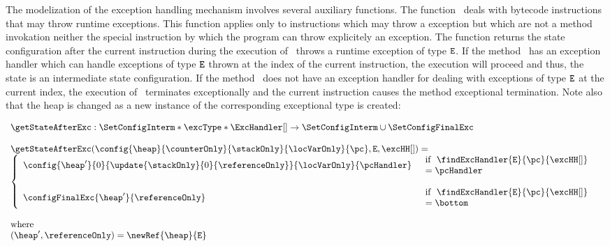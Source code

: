  The modelization of the exception handling mechanism involves several auxiliary functions. 
 The function \getStateAfterExc \ deals with bytecode instructions that may throw runtime exceptions.
 This function applies only to instructions which may throw a \RuntimeExc{} exception  but which are not a method
 invokation neither the special instruction
 by which the program can throw explicitely an exception.
 The function returns the state  configuration after the current instruction during the execution of \methodd \ throws a runtime exception
 of type $\mbox{\rm\texttt{E}}$. If the  method \methodd \ has an  exception handler which can handle  exceptions of type
 $\mbox{\rm\texttt{E}}$ thrown at the index of the current  instruction,
 the execution will proceed and thus, the state is an intermediate state configuration.
 If the method \methodd \ does not have an exception handler for dealing with exceptions of type $\mbox{\rm\texttt{E}}$ 
 at the current index, the execution of \methodd \ terminates exceptionally and the current instruction
 causes the method exceptional termination. Note also that the heap is changed as a new instance of the corresponding exceptional 
 type is created:

 
 $$\begin{array}{l}
          \getStateAfterExc : \SetConfigInterm * \excType * \ExcHandler[] \rightarrow \SetConfigInterm \cup \SetConfigFinalExc  \\
	  \\
	  \getStateAfterExc( \config{\heap}{\counterOnly}{\stackOnly}{\locVarOnly}{\pc}, \mbox{\rm\texttt{E}},  \excHH[] ) = \\
          \left\{\begin{array}{ll}
	        \config{\heap'}{0}{\update{\stackOnly}{0}{\referenceOnly}}{\locVarOnly}{\pcHandler} & \begin{array}{l}  
                                                                                                           \mbox{\rm if \ \findExcHandler{\mbox{\rm\texttt{E}}}{\pc}{\excHH[]}} \\
													   =\pcHandler 
												      \end{array}	   
													   \\
		& \\
		\configFinalExc{\heap'}{\referenceOnly} & \begin{array}{l}     
		                                                             \mbox{\rm  if \ \findExcHandler{\mbox{\rm\texttt{E}}}{\pc}{\excHH[]} } \\
		                                                             = \bottom  
		                                                        \end{array}
	  \end{array}\right.\\
	  \\
        \mbox{\rm where }\\
	(\heap', \referenceOnly )= \newRef{\heap}{\mbox{\rm\texttt{E}}}
    \end{array}
 $$
 




